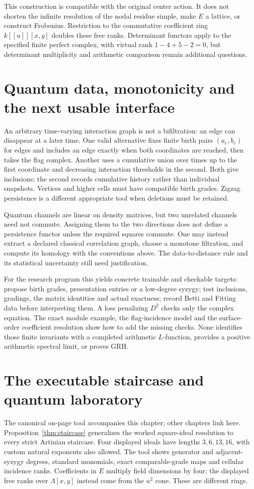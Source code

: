 \documentclass[11pt,oneside,openany]{book}
\theoremstyle{definition}\newtheorem{definition}[theorem]{Definition}
\theoremstyle{remark}\newtheorem{remark}[theorem]{Remark}
\begin{document}
This construction is compatible with the original center action. It does
not shorten the infinite resolution of the nodal residue simple, make
$E$ a lattice, or construct Frobenius. Restriction to the commutative
coefficient ring $k[[u]][x,y]$ doubles these free ranks. Determinant
functors apply to the specified finite perfect complex, with virtual
rank $1-4+5-2=0$, but determinant multiplicity and arithmetic comparison
remain additional questions.

\section{Quantum data, monotonicity and the next usable interface}
An arbitrary time-varying interaction graph is not a bifiltration: an
edge can disappear at a later time. One valid alternative fixes finite
birth pairs $(a_e,b_e)$ for edges and includes an edge exactly when both
coordinates are reached, then takes the flag complex. Another uses a
cumulative union over times up to the first coordinate and decreasing
interaction thresholds in the second. Both give inclusions; the second
records cumulative history rather than individual snapshots. Vertices
and higher cells must have compatible birth grades. Zigzag persistence
is a different appropriate tool when deletions must be retained.

Quantum channels are linear on density matrices, but two unrelated
channels need not commute. Assigning them to the two directions does
not define a persistence functor unless the required squares commute.
One may instead extract a declared classical correlation graph, choose
a monotone filtration, and compute its homology with the conventions
above. The data-to-distance rule and its statistical uncertainty still
need justification.

For the research program this yields concrete trainable and checkable
targets: propose birth grades, presentation entries or a low-degree
syzygy; test inclusions, gradings, the matrix identities and actual
exactness; record Betti and Fitting data before interpreting them.
A loss penalizing $D^2$ checks only the complex equation. The exact
module example, the flag-incidence model and the surface-order coefficient
resolution show how to add the missing checks. None identifies those
finite invariants with a completed arithmetic $L$-function, provides a
positive arithmetic spectral limit, or proves GRH.

\section{The executable staircase and quantum laboratory}
The canonical on-page tool accompanies this chapter; other chapters link
here. Proposition~\ref{thm:staircase} generalizes the worked square-ideal
resolution to every strict Artinian staircase. Four displayed ideals have
lengths $3,6,13,16$, with custom natural exponents also allowed. The tool
shows generator and adjacent-syzygy degrees, standard monomials, exact
comparable-grade maps and cellular incidence ranks. Coefficients in $E$
multiply field dimensions by four; the displayed free ranks over
$\Lambda[x,y]$ instead come from the $u^2$ cone. These are different rings.
\end{document}
